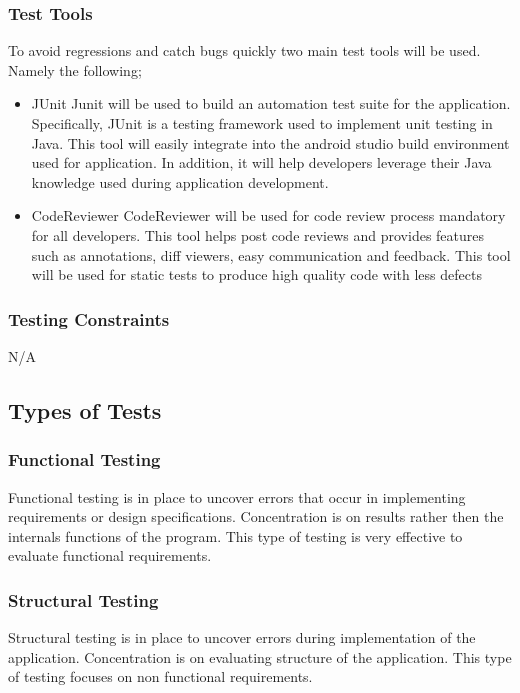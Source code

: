 \documentclass[12pt]{article}
\begin{document}
\subsubsection{Test Tools}
To avoid regressions and catch bugs quickly two main test tools will be used. Namely the following;
\begin{itemize}
\item JUnit \textemdash Junit will be used to build an automation test suite for the application. Specifically, JUnit is a testing framework used to implement unit testing in Java. This tool will easily integrate into the android studio build environment used for application. In addition, it will help developers leverage their Java knowledge used during application development. 
\item CodeReviewer \textemdash CodeReviewer will be used for code review process mandatory for all developers. This tool helps post code reviews and provides features such as annotations, diff viewers, easy communication and feedback. This tool will be used for static tests to produce high quality code with less defects
 \end{itemize}

\subsubsection{ Testing Constraints}
N/A

\subsection{Types of Tests}

\subsubsection{Functional Testing}
Functional testing is in place to uncover errors that occur in implementing requirements or design specifications. Concentration is on results rather then the internals functions of the program. This type of testing is very effective to evaluate functional requirements.

\subsubsection{Structural Testing}
Structural testing is in place to uncover errors during implementation of the application. Concentration is on evaluating structure of the application. This type of testing focuses on non functional requirements.  
\end{document}
